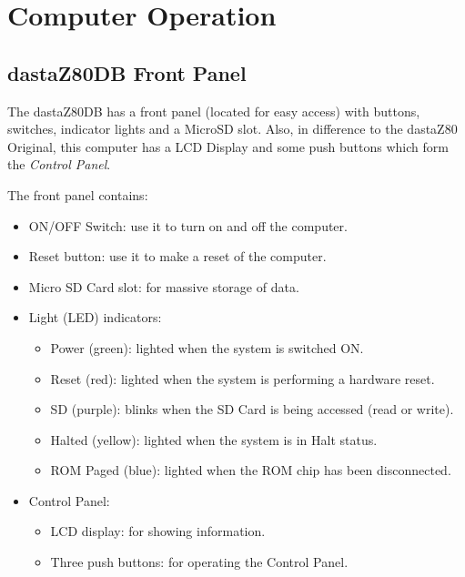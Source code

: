 \section{Computer Operation}
    
    \subsection{dastaZ80DB Front Panel}
    \label{subsec:frontpanel}

    The dastaZ80DB has a front panel (located for easy access) with buttons,
    switches, indicator lights and a MicroSD slot. Also, in difference to the
    dastaZ80 Original, this computer has a LCD Display and some push buttons
    which form the \textit{Control Panel}.

    The front panel contains:

    \begin{itemize}
        \item ON/OFF Switch: use it to turn on and off the computer.
        \item Reset button: use it to make a reset of the computer.
        \item Micro SD Card slot: for massive storage of data.
        \item Light (LED) indicators:
        \begin{itemize}
            \item Power (green): lighted when the system is switched ON.
            \item Reset (red): lighted when the system is performing a hardware
                reset.
            \item SD (purple): blinks when the SD Card is being accessed
                (read or write).
            \item Halted (yellow): lighted when the system is in Halt status.
            \item ROM Paged (blue): lighted when the ROM chip has been
                disconnected.
        \end{itemize}
        \item Control Panel:
            \begin{itemize}
                \item LCD display: for showing information.
                \item Three push buttons: for operating the Control Panel.
            \end{itemize}
    \end{itemize}

